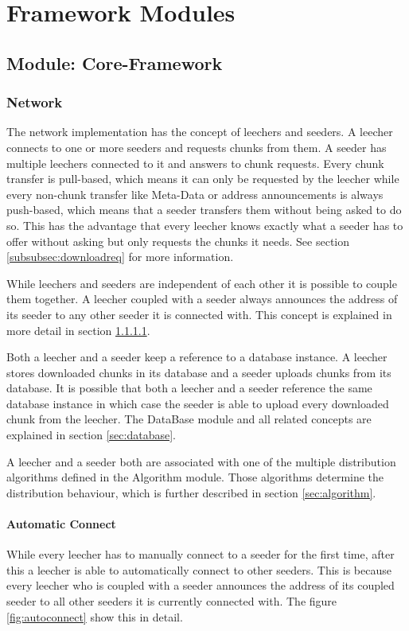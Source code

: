 \chapter{Framework Modules}
\section{Module: Core-Framework}
\label{sec:core}
\subsection{Network}
The network implementation has the concept of leechers and seeders. A leecher connects to one or more seeders and requests chunks from them. A seeder has multiple leechers connected to it and answers to chunk requests. Every chunk transfer is pull-based, which means it can only be requested by the leecher while every non-chunk transfer like Meta-Data or address announcements is always push-based, which means that a seeder transfers them without being asked to do so. This has the advantage that every leecher knows exactly what a seeder has to offer without asking but only requests the chunks it needs. See section \ref{subsubsec:downloadreq} for more information.

While leechers and seeders are independent of each other it is possible to couple them together. A leecher coupled with a seeder always announces the address of its seeder to any other seeder it is connected with. This concept is explained in more detail in section \ref{subsubsec:autoconnect}.

Both a leecher and a seeder keep a reference to a database instance. A leecher stores downloaded chunks in its database and a seeder uploads chunks from its database. It is possible that both a leecher and a seeder reference the same database instance in which case the seeder is able to upload every downloaded chunk from the leecher. The DataBase module and all related concepts are explained in section \ref{sec:database}.

A leecher and a seeder both are associated with one of the multiple distribution algorithms defined in the Algorithm module. Those algorithms determine the distribution behaviour, which is further described in section \ref{sec:algorithm}.

\subsubsection{Automatic Connect}
\label{subsubsec:autoconnect}
While every leecher has to manually connect to a seeder for the first time, after this a leecher is able to automatically connect to other seeders. This is because every leecher who is coupled with a seeder announces the address of its coupled seeder to all other seeders it is currently connected with. The figure \ref{fig:autoconnect} show this in detail.

